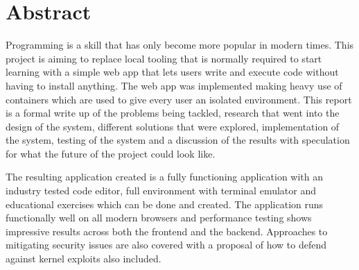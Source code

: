 \section{Abstract}


Programming is a skill that has only become more popular in modern times. This project is aiming to replace local tooling that is normally required to start learning with a simple web app that lets users write and execute code without having to install anything. The web app was implemented making heavy use of containers which are used to give every user an isolated environment. This report is a formal write up of the problems being tackled, research that went into the design of the system, different solutions that were explored, implementation of the system, testing of the system and a discussion of the results with speculation for what the future of the project could look like. 

The resulting application created is a fully functioning application with an industry tested code editor, full environment with terminal emulator and educational exercises which can be done and created. The application runs functionally well on all modern browsers and performance testing shows impressive results across both the frontend and the backend. Approaches to mitigating security issues are also covered with a proposal of how to defend against kernel exploits also included.
\pagebreak


